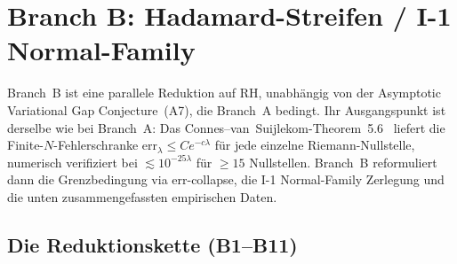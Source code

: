 \documentclass[12pt,a4paper]{article}
\theoremstyle{definition}
\theoremstyle{remark}
\begin{document}
\section{Branch B: Hadamard-Streifen / I-1 Normal-Family}
\label{sec:branch-b}

Branch~B ist eine parallele Reduktion auf RH, unabhängig von der
Asymptotic Variational Gap Conjecture~(A7), die Branch~A bedingt. Ihr
Ausgangspunkt ist derselbe wie bei Branch~A: Das
Connes--van~Suijlekom-Theorem~5.6~\cite{ConnesvS2025} liefert die
Finite-$N$-Fehlerschranke
$\mathrm{err}_\lambda \leq C e^{-c\lambda}$ für jede einzelne
Riemann-Nullstelle, numerisch verifiziert bei $\lesssim 10^{-25\lambda}$
für $\geq 15$ Nullstellen. Branch~B reformuliert dann die
Grenzbedingung via err-collapse, die I-1 Normal-Family Zerlegung und
die unten zusammengefassten empirischen Daten.


\subsection{Die Reduktionskette (B1--B11)}
\label{sec:branch-b-chain}
\end{document}
